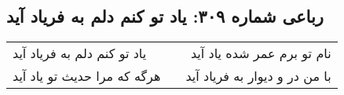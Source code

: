 \begin{center}
\section*{رباعی شماره ۳۰۹: یاد تو کنم دلم به فریاد آید}
\label{sec:sh309}
\begin{longtable}{l p{0.5cm} r}
یاد تو کنم دلم به فریاد آید
&&
نام تو برم عمر شده یاد آید
\\
هرگه که مرا حدیث تو یاد آید
&&
با من در و دیوار به فریاد آید
\\
\end{longtable}
\end{center}
